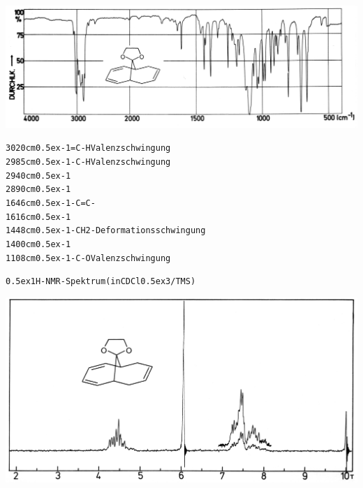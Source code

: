 \documentclass[a4paper,11pt]{article}
\begin{document}
\hspace*{-0.5cm}\includegraphics[width=15.14cm]{IR_038}
\begin{alltt}

3020 cm\raise0.5ex\hbox{-1}     =C-H     Valenzschwingung
2985 cm\raise0.5ex\hbox{-1}     -C-H     Valenzschwingung
2940 cm\raise0.5ex\hbox{-1}
2890 cm\raise0.5ex\hbox{-1}
1646 cm\raise0.5ex\hbox{-1}     -C=C-
1616 cm\raise0.5ex\hbox{-1}
1448 cm\raise0.5ex\hbox{-1}     -CH2-    Deformationsschwingung
1400 cm\raise0.5ex\hbox{-1}
1108 cm\raise0.5ex\hbox{-1}     -C-O     Valenzschwingung


\leavevmode\raise0.5ex\hbox{1}H-NMR-Spektrum (in CDCl\lower0.5ex\hbox{3}/TMS)
\end{alltt}
\hspace*{-0.25cm}\includegraphics[width=14.38cm]{NMR_039}
\end{document}
